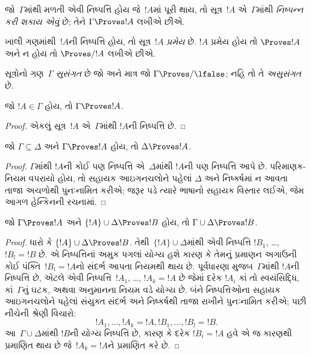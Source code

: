 \begin{defn}[નિષ્પન્નક્ષમતા]
જો~$\Gamma$માંથી મળતી એવી નિષ્પત્તિ હોય જે~$!A$માં પૂરી થાય,
તો સૂત્ર~$!A$ એ~$\Gamma$માંથી \emph{નિષ્પન્ન કરી શકાય એવું} છે; તેને
$\Gamma \Proves !A$ લખીએ છીએ.
\end{defn}

\begin{defn}[પ્રમેયો]
ખાલી ગણમાંથી~$!A$ની નિષ્પત્તિ હોય, તો સૂત્ર~$!A$
\emph{પ્રમેય} છે. $!A$ પ્રમેય હોય તો $\Proves !A$ અને ન હોય તો
$\Proves/ !A$ લખીએ છીએ.
\end{defn}

\begin{defn}[સુસંગતતા]
સૂત્રોનો ગણ~$\Gamma$ \emph{સુસંગત} છે જો અને માત્ર જો
$\Gamma\Proves/ \lfalse$; નહિ તો તે \emph{અસુસંગત} છે.
\end{defn}

\begin{prop}[સ્વવાચકતા]
જો $!A \in \Gamma$ હોય, તો $\Gamma \Proves !A$.
\end{prop}

\begin{proof}
  એકલું સૂત્ર~$!A$ એ~$\Gamma$માંથી $!A$ની નિષ્પત્તિ છે.
\end{proof}

\begin{prop}
જો $\Gamma \subseteq \Delta$ અને $\Gamma \Proves !A$ હોય, તો
$\Delta \Proves !A$.
\end{prop}

\begin{proof}
$\Gamma$માંથી $!A$ની કોઈ પણ નિષ્પત્તિ એ~$\Delta$માંથી $!A$ની પણ
નિષ્પત્તિ આપે છે. પરિમાણક-નિયમ વપરાયો હોય, તો સહાયક આઇગનચલોને
પહેલાં $\Delta$ અને નિષ્કર્ષમાં ન આવતા તાજા અચળોથી પુનઃનામિત કરીએ;
જરૂર પડે ત્યારે ભાષાનો સહાયક વિસ્તાર લઈએ, જેમ આગળ હેન્કિનની રચનામાં.
\end{proof}

\begin{prop}[પરંપરિતતા]
જો $\Gamma \Proves !A$ અને $\{!A\} \cup \Delta \Proves !B$ હોય, તો
$\Gamma \cup \Delta \Proves !B$.
\end{prop}

\begin{proof}
  ધારો કે $\{!A\} \cup \Delta \Proves !B$. તેથી~$\{!A\} \cup
  \Delta$માંથી એવી નિષ્પત્તિ $!B_1$, \dots, $!B_l = !B$ છે.
  એ નિષ્પત્તિનાં અમુક પગલાં યોગ્ય હશે કારણ કે તેમનું પ્રમાણન
  અગાઉની કોઈ પંક્તિ~$!B_i = !A$નો સંદર્ભ આપતા નિયમથી થાય છે. પૂર્વધારણા
  મુજબ~$\Gamma$માંથી $!A$ની નિષ્પત્તિ છે, એટલે એવી
  નિષ્પત્તિ~$!A_1$, \dots, $!A_k = !A$ છે જેમાં દરેક $!A_i$ કાં
  તો સ્વયંસિદ્ધિ, કાં~$\Gamma$નું ઘટક, અથવા અનુમાનના નિયમ વડે
  યોગ્ય છે. બંને નિષ્પત્તિઓના સહાયક આઇગનચલોને પહેલાં સંયુક્ત સંદર્ભ અને
  નિષ્કર્ષથી તાજા રાખીને પુનઃનામિત કરીએ; પછી નીચેની શ્રેણી વિચારો:
  \[
  !A_1, \dots, !A_k = !A, !B_1, \dots, !B_l = !B.
  \]
  આ~$\Gamma \cup \Delta$માંથી $!B$ની યોગ્ય નિષ્પત્તિ છે, કારણ કે
  દરેક $!B_i = !A$ હવે એ જ કારણથી પ્રમાણિત થાય છે જે~$!A_k = !A$ને
  પ્રમાણિત કરે છે.
\end{proof}

